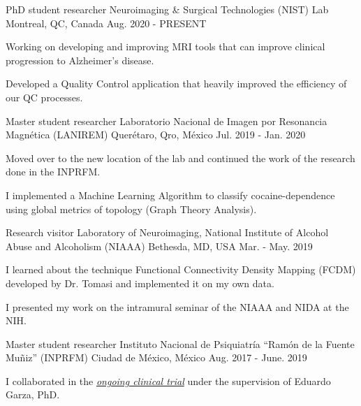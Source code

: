 \vspace{-3.2mm}
\vspace{-1.5mm}
\begin{cventries}
    \cventry
        {PhD student researcher}
        {Neuroimaging \& Surgical Technologies (NIST) Lab}
        {Montreal, QC, Canada}
        {Aug. 2020 - PRESENT}
        {
            \begin{cvitems}
                \item {Working on developing and improving MRI tools that can improve clinical progression to Alzheimer's disease.}
                \item {Developed a Quality Control application that heavily improved the efficiency of our QC processes.}
            \end{cvitems}
        }
    \cventry
        {Master student researcher}
        {Laboratorio Nacional de Imagen por Resonancia Magnética (LANIREM)}
        {Querétaro, Qro, México}
        {Jul. 2019 - Jan. 2020}
        {
            \begin{cvitems}
                \item {Moved over to the new location of the lab and continued the work of the research done in the INPRFM.}
                \item {I implemented a Machine Learning Algorithm to classify cocaine-dependence using global metrics of topology (Graph Theory Analysis).}
            \end{cvitems}
        }
    \cventry
        {Research visitor}
        {Laboratory of Neuroimaging, National Institute of Alcohol Abuse and
        Alcoholism (NIAAA)}
        {Bethesda, MD, USA}
        {Mar. - May. 2019}
        {
            \begin{cvitems}
                \item {I learned about the technique Functional Connectivity Density Mapping (FCDM) developed by Dr. Tomasi and implemented it on my own data.}
                \item {I presented my work on the intramural seminar of the NIAAA and NIDA at the NIH.}
            \end{cvitems}
        }
    \cventry
        {Master student researcher}
        {Instituto Nacional de Psiquiatría ``Ramón de la Fuente Muñiz''
        (INPRFM)}
        {Ciudad de México, México}
        {Aug. 2017 - June. 2019}
        {
            \begin{cvitems}
                \item {I collaborated in the \href{https://clinicaltrials.gov/ct2/show/study/NCT02986438?term=Jorge+Gonzalez-Olvera&cntry=MX&rank=2} {\textit{ongoing clinical trial}} under the supervision of Eduardo Garza, PhD.}

\end{cvitems}}
\end{cventries}
